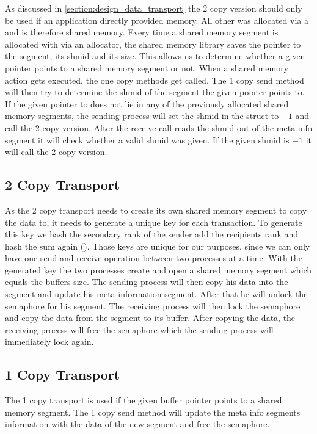 As discussed in \autoref{section:design_data_transport} the 2 copy version should only be used if an application directly provided memory.
All other  was allocated via a  and is therefore shared memory.
Every time a shared memory segment is allocated with via an allocator, the shared memory library saves the pointer to the segment, its shmid and its size.
This allows us to determine whether a given pointer points to a shared memory segment or not.
When a shared memory action gets executed, the one copy methods get called.
The 1 copy send method will then try to determine the shmid of the segment the given pointer points to.
If the given pointer to does not lie in any of the previously allocated shared memory segments, the sending process will set the shmid in the  struct to $-1$ and call the 2 copy version.
After the receive call reads the shmid out of the meta info segment it will check whether a valid shmid was given.
If the given shmid is $-1$ it will call the 2 copy version.

\subsection{2 Copy Transport}

As the 2 copy transport needs to create its own shared memory segment to copy the data to, it needs to generate a unique key for each transaction.
To generate this key we hash the secondary rank of the sender add the recipients rank and hash the sum again ().
Those keys are unique for our purposes, since we can only have one send and receive operation between two processes at a time.
With the generated key the two processes create and open a shared memory segment which equals the buffers size.
The sending process will then copy his data into the segment and update his meta information segment.
After that he will unlock the semaphore for his segment.
The receiving process will then lock the semaphore and copy the data from the segment to its buffer.
After copying the data, the receiving process will free the semaphore which the sending process will immediately lock again. 

\subsection{1 Copy Transport}

The 1 copy transport is used if the given buffer pointer points to a shared memory segment.
The 1 copy send method will update the meta info segments information with the data of the new segment and free the semaphore.

